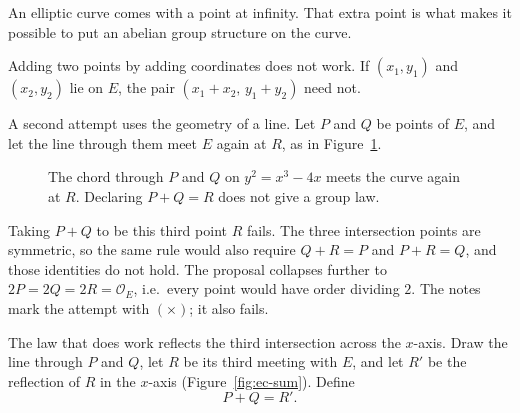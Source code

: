 An elliptic curve comes with a point at infinity. That extra point is what makes it possible to put an abelian group structure on the curve.

Adding two points by adding coordinates does not work. If $(x_1,y_1)$ and $(x_2,y_2)$ lie on $E$, the pair $(x_1+x_2,\,y_1+y_2)$ need not.


A second attempt uses the geometry of a line. Let $P$ and $Q$ be points of $E$, and let the line through them meet $E$ again at $R$, as in Figure~\ref{fig:ec-naive}.

\begin{figure}[H]
\centering
{}
\caption{The chord through $P$ and $Q$ on $y^2=x^3-4x$ meets the curve again at $R$. Declaring $P+Q=R$ does not give a group law.}
\label{fig:ec-naive}
\end{figure}

\begin{remark}
Taking $P+Q$ to be this third point $R$ fails. The three intersection points are symmetric, so the same rule would also require $Q+R=P$ and $P+R=Q$, and those identities do not hold. The proposal collapses further to $2P=2Q=2R=\mathcal{O}_E$, i.e.\ every point would have order dividing $2$. The notes mark the attempt with $(\times)$; it also fails.
\end{remark}

The law that does work reflects the third intersection across the $x$-axis. Draw the line through $P$ and $Q$, let $R$ be its third meeting with $E$, and let $R'$ be the reflection of $R$ in the $x$-axis (Figure~\ref{fig:ec-sum}). Define
\[
    P+Q=R'.
\]

